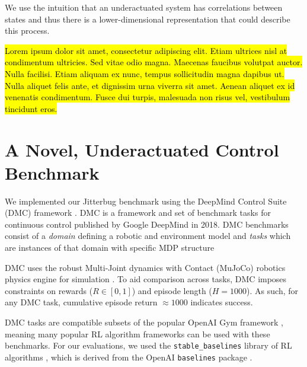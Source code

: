 \documentclass[letterpaper, 10 pt, conference]{ieeeconf}
\begin{document}
We use the intuition that an underactuated system has correlations between states %
and thus there is a lower-dimensional representation that could describe this process. 

\hl{Lorem ipsum dolor sit amet, consectetur adipiscing elit. Etiam ultrices nisl at condimentum ultricies. Sed vitae odio magna. Maecenas faucibus volutpat auctor. Nulla facilisi. Etiam aliquam ex nunc, tempus sollicitudin magna dapibus ut. Nulla aliquet felis ante, et dignissim urna viverra sit amet. Aenean aliquet ex id venenatis condimentum. Fusce dui turpis, malesuada non risus vel, vestibulum tincidunt eros.}



\section{A Novel, Underactuated Control Benchmark}
We implemented our Jitterbug benchmark using the DeepMind Control Suite (DMC) framework \cite{Tassa2018DMC}.
DMC is a framework and set of benchmark tasks for continuous control published by Google DeepMind in 2018.
DMC benchmarks consist of a \emph{domain} defining a robotic and environment model and \emph{tasks} which are instances of that domain with specific MDP structure

DMC uses the robust Multi-Joint dynamics with Contact (MuJoCo) robotics physics engine for simulation \cite{Todorov2012MuJoCo}.
To aid comparison across tasks, DMC imposes constraints on rewards ($R \in [0, 1]$) and episode length ($H = 1000$).
As such, for any DMC task, cumulative episode return $\approx 1000$ indicates success.

DMC tasks are compatible subsets of the popular OpenAI Gym framework \cite{Brockman2016Gym}, meaning many popular RL algorithm frameworks can be used with these benchmarks.
For our evaluations, we used the \texttt{stable\_baselines} library of RL algorithms \cite{Hill2018Stable}, which is derived from the OpenAI \texttt{baselines} package \cite{Dhariwal2017Baselines}.
\end{document}
